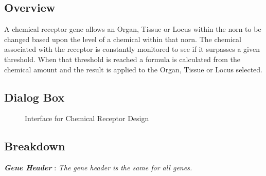 \documentclass[11pt,twoside,a4paper]{article}
\begin{document}
\begin{minipage}{0.5\linewidth}
\subsection{Overview}
A chemical receptor gene allows an Organ, Tissue or Locus within the norn to be changed based upon the level of a chemical within that norn. The chemical associated with the receptor is constantly monitored to see if it surpasses a given threshold. When that threshold is reached a formula is calculated from the chemical amount and the result is applied to the Organ, Tissue or Locus selected.
\end{minipage}
\begin{minipage}{0.1\linewidth}\end{minipage}
\begin{minipage}{0.5\linewidth}
\subsection{Dialog Box}
\begin{figure}[H]
	\centerline {} %
	\caption{Interface for Chemical Receptor Design}
	\label{fig:chemical_receptor}
\end{figure}
\end{minipage}

\subsection{Breakdown}

\textbf{\textit{Gene Header}} : \emph{The gene header is the same for all genes. }~\\


\end{document}
